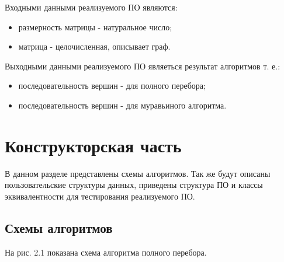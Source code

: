 \documentclass[12pt,a4paper]{report}
\begin{document}
	
Входными данными реализуемого ПО являются:

\begin{itemize}
	\item размерность матрицы - натуральное число;
	\item матрица - целочисленная, описывает граф.
\end{itemize}

Выходными данными реализуемого ПО являеться результат алгоритмов т. е.:
\begin{itemize}
	\item последовательность вершин - для полного перебора;
	\item последовательность вершин - для муравьиного алгоритма.
	
\end{itemize}



\chapter{Конструкторская часть}

В данном разделе представлены схемы алгоритмов. Так же будут описаны пользовательские структуры данных, приведены структура ПО и классы эквивалентности для тестирования реализуемого ПО.

\section{Схемы алгоритмов}

На рис. 2.1 показана схема алгоритма полного перебора.

\begin{figure}[ht!]
\end{figure}
\end{document}
